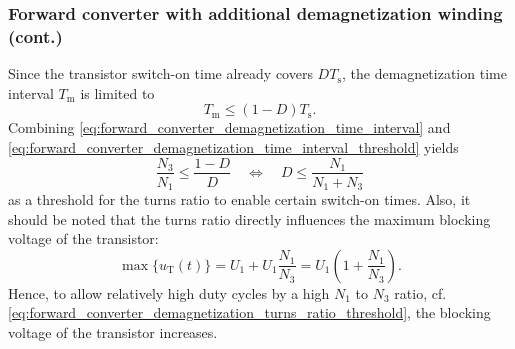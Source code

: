 \begin{frame}
    \frametitle{Forward converter with additional demagnetization winding (cont.)}
    Since the transistor switch-on time already covers $D T_\mathrm{s}$, the demagnetization time interval $T_\mathrm{m}$ is limited to
    \begin{equation}
        T_\mathrm{m} \leq (1-D)T_\mathrm{s}.
        \label{eq:forward_converter_demagnetization_time_interval_threshold}
    \end{equation}
    Combining \eqref{eq:forward_converter_demagnetization_time_interval} and \eqref{eq:forward_converter_demagnetization_time_interval_threshold} yields
    \begin{equation}
        \frac{N_3}{N_1} \leq \frac{1-D}{D} \quad \Leftrightarrow \quad D \leq \frac{N_1}{N_1+N_3}
        \label{eq:forward_converter_demagnetization_turns_ratio_threshold}
    \end{equation}
    as a threshold for the turns ratio to enable certain switch-on times. Also, it should be noted that the turns ratio directly influences the maximum blocking voltage of the transistor:
    \begin{equation}
        \max\{u_\mathrm{T}(t)\} = U_1 + U_1 \frac{N_1}{N_3} = U_1 \left(1 + \frac{N_1}{N_3}\right). 
    \end{equation}
    Hence, to allow relatively high duty cycles by a high $N_1$ to $N_3$ ratio, cf. \eqref{eq:forward_converter_demagnetization_turns_ratio_threshold}, the blocking voltage of the transistor increases.
\end{frame}

